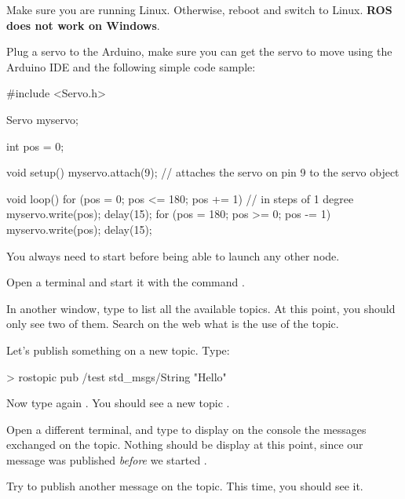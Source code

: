 \documentclass{instructions}
\begin{document}
    
Make sure you are running Linux. Otherwise, reboot and switch to Linux.
\textbf{ROS does not work on Windows}.


Plug a servo to the Arduino, make sure you can get the servo to move using the
Arduino IDE and the following simple code sample:

\begin{cppcode}
#include <Servo.h>

Servo myservo;

int pos = 0;

void setup() {
  myservo.attach(9);  // attaches the servo on pin 9 to the servo object
}

void loop() {
  for (pos = 0; pos <= 180; pos += 1) {
    // in steps of 1 degree
    myservo.write(pos);
    delay(15);
  }
  for (pos = 180; pos >= 0; pos -= 1) {
    myservo.write(pos);
    delay(15);
  }
}
\end{cppcode}


You always need to start  before being able to launch any other node.

Open a terminal and start it with the command .

In another window, type  to list all the available topics. At
this point, you should only see two of them. Search on the web what is the use
of the  topic.

Let's publish something on a new topic. Type: 

\begin{shcode}
> rostopic pub /test std_msgs/String "Hello"
\end{shcode}

Now type again . You should see a new topic .

Open a different terminal, and type  to display on the
console the messages exchanged on the  topic. Nothing should be
display at this point, since our  message was published
\emph{before} we started .

Try to publish another message on the  topic. This time, you should
see it.

\end{document}
